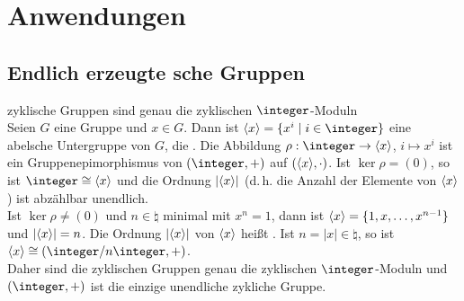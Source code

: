 \section{%
    Anwendungen%
}

\subsection{%
    Endlich erzeugte sche Gruppen%
}

\begin{Satz}{zyklische Gruppen sind genau die zyklischen $\integer$-Moduln} \\
    Seien $G$ eine Gruppe und $x \in G$.
    Dann ist $\aufspann{x} = \{x^i \;|\; i \in \integer\}$
    eine abelsche Untergruppe von $G$, die .
    Die Abbildung $\rho: \integer \rightarrow \aufspann{x}$, $i \mapsto x^i$
    ist ein Gruppenepimorphismus von $(\integer, +)$ auf
    $(\langle x \rangle, \cdot)$.
    Ist $\ker \rho = (0)$, so ist $\integer \cong \aufspann{x}$ und die Ordnung
    $|\langle x \rangle|$ (d.\,h. die Anzahl der Elemente von $\langle x \rangle$) ist
    abzählbar unendlich. \\
    Ist $\ker \rho \not= (0)$ und $n \in \natural$ minimal mit $x^n = 1$, dann
    ist $\langle x \rangle = \{1, x, \dotsc, x^{n-1}\}$ und $|\langle x \rangle| = n$.
    Die Ordnung $|\langle x \rangle|$ von $\langle x \rangle$ heißt
    .
    Ist $n = |x| \in \natural$, so ist
    $\aufspann{x} \cong (\integer/n\integer, +)$. \\
    Daher sind die zyklischen Gruppen genau die zyklischen $\integer$-Moduln
    und $(\integer, +)$ ist die einzige unendliche zykliche Gruppe.
\end{Satz}

